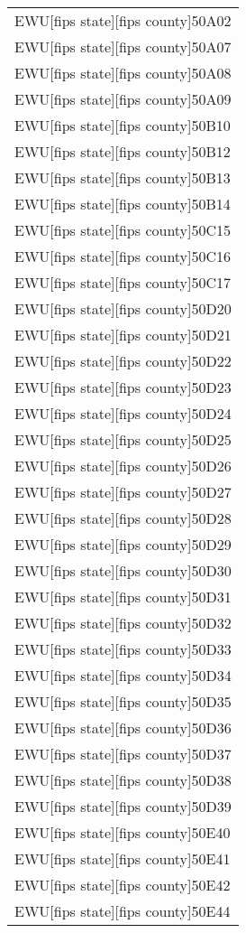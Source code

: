 \begin{supertabular}{l}
EWU[fips state][fips county]50A02\\
EWU[fips state][fips county]50A07\\
EWU[fips state][fips county]50A08\\
EWU[fips state][fips county]50A09\\
EWU[fips state][fips county]50B10\\
EWU[fips state][fips county]50B12\\
EWU[fips state][fips county]50B13\\
EWU[fips state][fips county]50B14\\
EWU[fips state][fips county]50C15\\
EWU[fips state][fips county]50C16\\
EWU[fips state][fips county]50C17\\
EWU[fips state][fips county]50D20\\
EWU[fips state][fips county]50D21\\
EWU[fips state][fips county]50D22\\
EWU[fips state][fips county]50D23\\
EWU[fips state][fips county]50D24\\
EWU[fips state][fips county]50D25\\
EWU[fips state][fips county]50D26\\
EWU[fips state][fips county]50D27\\
EWU[fips state][fips county]50D28\\
EWU[fips state][fips county]50D29\\
EWU[fips state][fips county]50D30\\
EWU[fips state][fips county]50D31\\
EWU[fips state][fips county]50D32\\
EWU[fips state][fips county]50D33\\
EWU[fips state][fips county]50D34\\
EWU[fips state][fips county]50D35\\
EWU[fips state][fips county]50D36\\
EWU[fips state][fips county]50D37\\
EWU[fips state][fips county]50D38\\
EWU[fips state][fips county]50D39\\
EWU[fips state][fips county]50E40\\
EWU[fips state][fips county]50E41\\
EWU[fips state][fips county]50E42\\
EWU[fips state][fips county]50E44\\

\end{supertabular}
